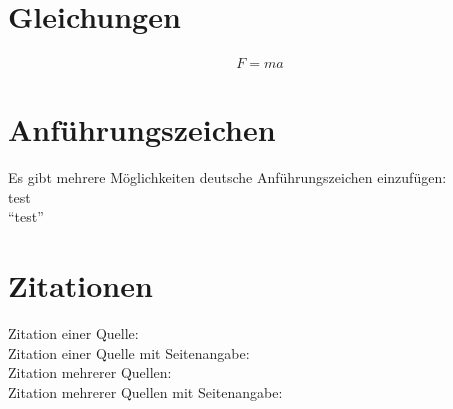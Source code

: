 
\cleardoublepage
\section{Gleichungen}
\label{sec:gleichungen}

\begin{align}
	F = m a 
	\label{eqn:newton}
\end{align}


\section{Anführungszeichen}
\label{sec:anfuehrungszeichen}
Es gibt mehrere Möglichkeiten deutsche Anführungszeichen einzufügen:\\
\glqq test\grqq\\
"`test"'\\

\section{Zitationen}

Zitation einer Quelle: \cite{Mustermann.2012}\\
Zitation einer Quelle mit Seitenangabe: \cite[12-16]{Mustermann.2012}\\
Zitation mehrerer Quellen: \cites{Mustermann.2012}{Musterfrau.2011}\\
Zitation mehrerer Quellen mit Seitenangabe: \cites[12-16]{Mustermann.2012}[3]{Musterfrau.2011}\\

